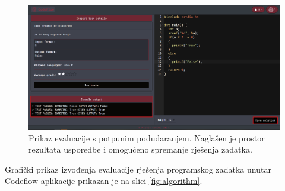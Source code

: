 \documentclass[times, utf8, zavrsni, numeric]{fer}
\begin{document}
	\begin{figure}[H]
		\centering
		\includegraphics[width=\linewidth]{pictures/evaluacija/goodeval.png}
		\caption{Prikaz evaluacije s potpunim podudaranjem. Naglašen je prostor rezultata usporedbe i omogućeno spremanje rješenja zadatka.}
		\label{fig:goodeval}
	\end{figure}
	Grafički prikaz izvođenja evaluacije rješenja programskog zadatka unutar Codeflow aplikacije prikazan je na slici \ref{fig:algorithm}.
\end{document}
